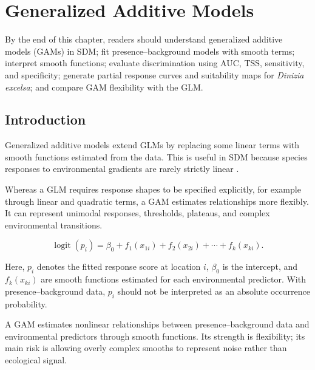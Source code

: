 \chapter[GAM]{Generalized Additive Models}

\begin{objetivos}
By the end of this chapter, readers should understand generalized additive
models (GAMs) in SDM; fit presence--background models with smooth terms;
interpret smooth functions; evaluate discrimination using AUC, TSS,
sensitivity, and specificity; generate partial response curves and suitability
maps for \textit{Dinizia excelsa}; and compare GAM flexibility with the GLM.
\end{objetivos}

\section{Introduction}

Generalized additive models extend GLMs by replacing some linear terms with
smooth functions estimated from the data. This is useful in SDM because species
responses to environmental gradients are rarely strictly linear
\parencite{guisan2002,guisan2017habitat,wood2017generalized}.

Whereas a GLM requires response shapes to be specified explicitly, for example
through linear and quadratic terms, a GAM estimates relationships more
flexibly. It can represent unimodal responses, thresholds, plateaus, and
complex environmental transitions.

\begin{equationbox}
\[
\operatorname{logit}(p_i)=\beta_0+f_1(x_{1i})+f_2(x_{2i})+\cdots+f_k(x_{ki}).
\]
\end{equationbox}

Here, $p_i$ denotes the fitted response score at location $i$, $\beta_0$ is the
intercept, and $f_k(x_{ki})$ are smooth functions estimated for each
environmental predictor. With presence--background data, $p_i$ should not be
interpreted as an absolute occurrence probability.

\begin{conceito}[title={\faBook\quad GAMs in SDM}]
A GAM estimates nonlinear relationships between presence--background data and
environmental predictors through smooth functions. Its strength is flexibility;
its main risk is allowing overly complex smooths to represent noise rather than
ecological signal.
\end{conceito}

